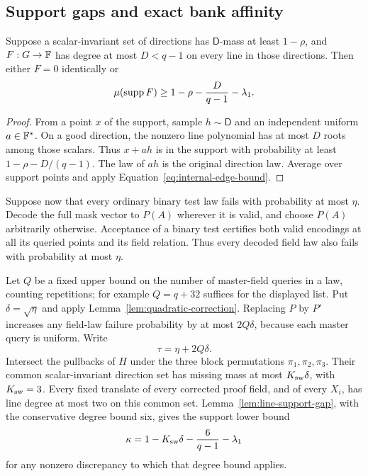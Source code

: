 \subsection{Support gaps and exact bank affinity}

\begin{lemma}\label{lem:line-support-gap}
Suppose a scalar-invariant set of directions has
$\mathsf D$-mass at least $1-\rho$, and $F:G\to\mathbb F$ has degree at most
$D<q-1$ on every line in those directions. Then either $F=0$
identically or
\[
 \mu(\operatorname{supp} F)\geq 1-\rho-\frac{D}{q-1}-\lambda_1.
\]
\end{lemma}

\begin{proof}
From a point $x$ of the support, sample $h\sim\mathsf D$ and an
independent uniform $a\in\mathbb F^*$. On a good direction, the nonzero
line polynomial has at most $D$ roots among those scalars. Thus
$x+ah$ is in the support with probability at least
$1-\rho-D/(q-1)$. The law of $ah$ is the original direction law.
Average over support points and apply
Equation~\ref{eq:internal-edge-bound}.
\end{proof}

Suppose now that every ordinary binary test law fails with probability
at most $\eta$. Decode the full mask vector to $P(A)$ wherever it is
valid, and choose $P(A)$ arbitrarily otherwise. Acceptance of a binary
test certifies both valid encodings at all its queried points and its
field relation. Thus every decoded field law also fails with
probability at most $\eta$.

Let $Q$ be a fixed upper bound on the number of master-field queries
in a law, counting repetitions; for example $Q=q+32$ suffices for
the displayed list. Put $\delta=\sqrt\eta$ and apply
Lemma~\ref{lem:quadratic-correction}. Replacing $P$ by $P'$ increases
any field-law failure probability by at most $2Q\delta$, because
each master query is uniform. Write
\begin{equation}\label{eq:corrected-test-error}
 \tau=\eta+2Q\delta.
\end{equation}
Intersect the pullbacks of $H$ under the three block permutations
$\pi_1,\pi_2,\pi_3$. Their common scalar-invariant direction set has
missing mass at most $K_{\rm sw}\delta$, with $K_{\rm sw}=3$.
Every fixed translate of every corrected proof field, and of every
$X_i$, has line degree at most two on this common set.
Lemma~\ref{lem:line-support-gap}, with the conservative degree bound
six, gives the support lower bound
\begin{equation}\label{eq:kappa-support}
 \kappa=1-K_{\rm sw}\delta-\frac6{q-1}-\lambda_1
\end{equation}
for any nonzero discrepancy to which that degree bound applies.

